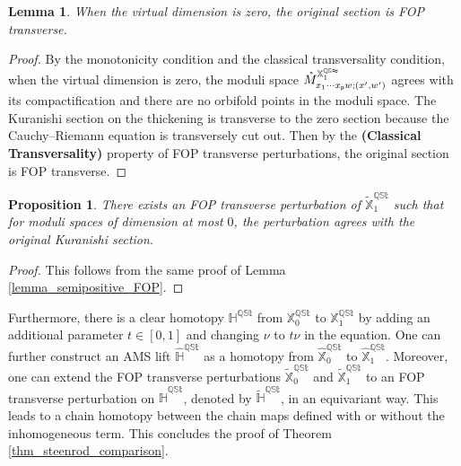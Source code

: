 \documentclass[reqno, 10pt]{amsart}
\numberwithin{equation}{section}
\numberwithin{equation}{section}
\newtheorem{prop}[thm]{Proposition}
\newtheorem{lemma}[thm]{Lemma}
\theoremstyle{definition}
\theoremstyle{remark}
\newcommand{\mb}{\mathbb}
\newcommand{\p}{{\sf p}}
\begin{document}
\begin{lemma}
When the virtual dimension is zero, the original section is FOP transverse.
\end{lemma}

\begin{proof}
By the monotonicity condition and the classical transversality condition, when the virtual dimension is zero, the moduli space $\mathring M_{x_1 \cdots x_\p w; (x', w')}^{\mb{X}_1^{\mb{QSt}}}$ agrees with its compactification and there are no orbifold points in the moduli space. The Kuranishi section on the thickening is transverse to the zero section because the Cauchy--Riemann equation is transversely cut out. Then by the {\bf (Classical Transversality)} property of FOP transverse perturbations, the original section is FOP transverse. 
\end{proof}

\begin{prop}
There exists an FOP transverse perturbation of $\tilde {\mb X}_1^{\mb{QSt}}$ such that for moduli spaces of dimension at most $0$, the perturbation agrees with the original Kuranishi section. 
\end{prop}

\begin{proof}
This follows from the same proof of Lemma \ref{lemma_semipositive_FOP}.
\end{proof}


Furthermore, there is a clear homotopy $\mb{H}^{\mb{QSt}}$ from $\mb{X}_0^{\mb{QSt}}$ to $\mb{X}_1^{\mb{QSt}}$ by adding an additional parameter $t \in [0, 1]$ and changing $\nu$ to $t \nu$ in the equation. One can further construct an AMS lift $\hat {\mb H}^{\mb{QSt}}$ as a homotopy from $\hat{\mb X}_0^{\mb{QSt}}$ to $\hat{\mb X}_1^{\mb{QSt}}$. Moreover, one can extend the FOP transverse perturbations $\tilde {\mb X}_0^{\mb{QSt}}$ and $\tilde {\mb X}_1^{\mb{QSt}}$ to an FOP transverse perturbation on $\hat {\mb H}^{\mb{QSt}}$, denoted by $\tilde {\mb H}^{\mb{QSt}}$, in an equivariant way. This leads to a chain homotopy between the chain maps defined with or without the inhomogeneous term. This concludes the proof of Theorem \ref{thm_steenrod_comparison}. 
\end{document}
